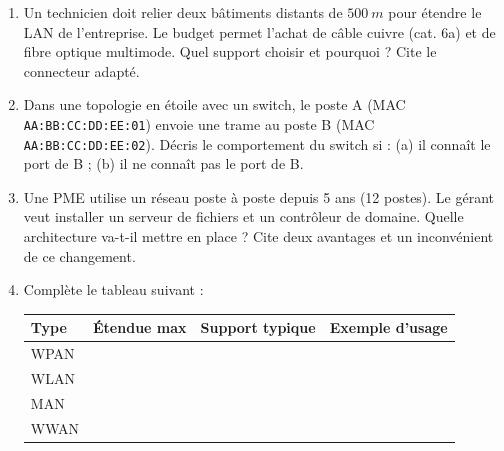 \documentclass[11pt]{article}
\begin{document}
\begin{exercice}
\begin{enumerate}
  \item Un technicien doit relier deux bâtiments distants de $\SI{500}{m}$ pour étendre le LAN de l'entreprise. Le budget permet l'achat de câble cuivre (cat. 6a) et de fibre optique multimode. Quel support choisir et pourquoi ? Cite le connecteur adapté.
  \item Dans une topologie en étoile avec un switch, le poste A (MAC \texttt{AA:BB:CC:DD:EE:01}) envoie une trame au poste B (MAC \texttt{AA:BB:CC:DD:EE:02}). Décris le comportement du switch si : (a) il connaît le port de B ; (b) il ne connaît pas le port de B.
  \item Une PME utilise un réseau poste à poste depuis 5 ans (12 postes). Le gérant veut installer un serveur de fichiers et un contrôleur de domaine. Quelle architecture va-t-il mettre en place ? Cite deux avantages et un inconvénient de ce changement.
  \item Complète le tableau suivant :
  \begin{center}
  \begin{tabularx}{\linewidth}{|l|X|X|X|}
  \hline
  \rowcolor{popblueL}
  \textbf{Type} & \textbf{Étendue max} & \textbf{Support typique} & \textbf{Exemple d'usage} \\
  \hline
  WPAN & & & \\
  \hline
  WLAN & & & \\
  \hline
  MAN & & & \\
  \hline
  WWAN & & & \\
  \hline
  \end{tabularx}
  \end{center}
\end{enumerate}
\end{exercice}
\end{document}
